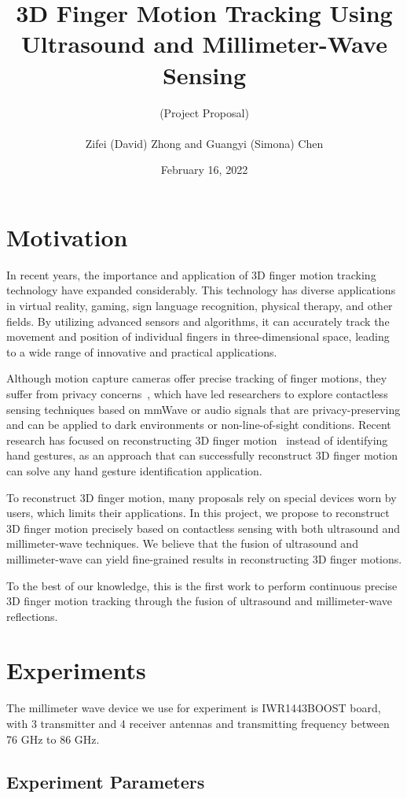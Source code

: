\documentclass[11pt, oneside]{article}   	%
\title{3D Finger Motion Tracking Using Ultrasound and Millimeter-Wave Sensing}
\author{(Project Proposal)\\ \\Zifei (David) Zhong and Guangyi (Simona) Chen}
\date{February 16, 2022}							%
\begin{document}
\maketitle

\section{Motivation}
In recent years, the importance and application of 3D finger motion tracking technology have expanded considerably. This technology has diverse applications in virtual reality, gaming, sign language recognition, physical therapy, and other fields. By utilizing advanced sensors and algorithms, it can accurately track the movement and position of individual fingers in three-dimensional space, leading to a wide range of innovative and practical applications.

Although motion capture cameras offer precise tracking of finger motions, they suffer from privacy concerns~\cite{ref:cameraprivacy18}, which have led researchers to explore contactless sensing techniques based on mmWave or audio signals that are privacy-preserving and can be applied to dark environments or non-line-of-sight conditions. Recent research has focused on reconstructing 3D finger motion~\cite{ref:neuropose21, ref:sslotr22, ref:mm4arm23} instead of identifying hand gestures, as an approach that can successfully reconstruct 3D finger motion can solve any hand gesture identification application.

To reconstruct 3D finger motion, many proposals rely on special devices worn by users, which limits their applications. In this project, we propose to reconstruct 3D finger motion precisely based on contactless sensing with both ultrasound and millimeter-wave techniques. We believe that the fusion of ultrasound and millimeter-wave can yield fine-grained results in reconstructing 3D finger motions.

To the best of our knowledge, this is the first work to perform continuous precise 3D finger motion tracking through the fusion of ultrasound and millimeter-wave reflections.

\section{Experiments}
The millimeter wave device we use for experiment is IWR1443BOOST board, with 3 transmitter and 4 receiver antennas and transmitting frequency between 76 GHz to 86 GHz.

\subsection{Experiment Parameters}
\end{document}
